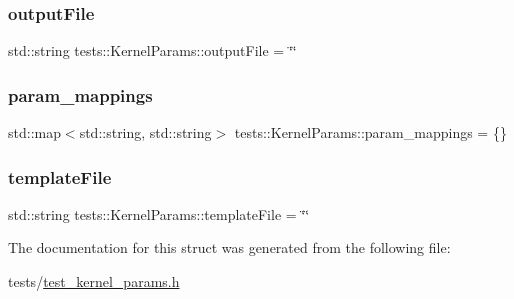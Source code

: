 \subsubsection{\texorpdfstring{output\+File}{outputFile}}
{\footnotesize\ttfamily std\+::string tests\+::\+Kernel\+Params\+::output\+File = \char`\"{}\char`\"{}}

\mbox{\label{structtests_1_1KernelParams_a80bd8fec07cf507128923b01df069162}} 
\subsubsection{\texorpdfstring{param\+\_\+mappings}{param\_mappings}}
{\footnotesize\ttfamily std\+::map$<$std\+::string, std\+::string$>$ tests\+::\+Kernel\+Params\+::param\+\_\+mappings = \{\}}

\mbox{\label{structtests_1_1KernelParams_aba4e8ce0e7f164dae2e76e492d2dc560}} 
\subsubsection{\texorpdfstring{template\+File}{templateFile}}
{\footnotesize\ttfamily std\+::string tests\+::\+Kernel\+Params\+::template\+File = \char`\"{}\char`\"{}}



The documentation for this struct was generated from the following file\+:\begin{DoxyCompactItemize}
\item 
tests/\hyperlink{test__kernel__params_8h}{test\+\_\+kernel\+\_\+params.\+h}\end{DoxyCompactItemize}
